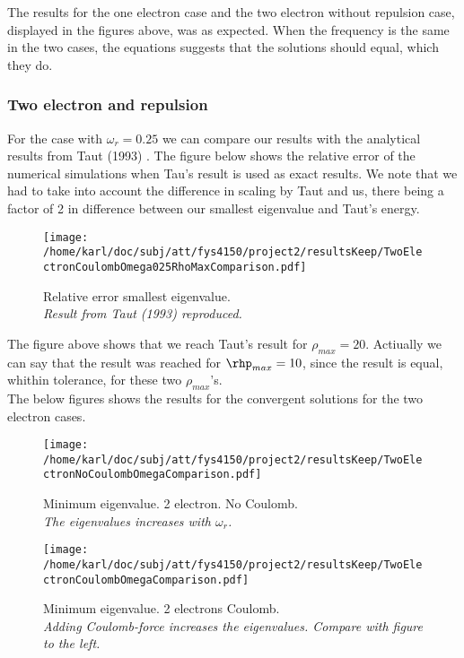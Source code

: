 \documentclass{article}
\begin{document}
The results for the one electron case and the two electron without repulsion case, displayed in the figures above, was as expected. When the frequency is the same in the two cases, the equations suggests that the solutions should equal, which they do.

\subsubsection{Two electron and repulsion}
For the case with $\omega_r = 0.25$ we can compare our results with the analytical results from Taut (1993) \cite{taut}. The figure below shows the relative error of the numerical simulations when Tau's result is used as exact results. We note that we had to take into account the difference in scaling by Taut and us, there being a factor of 2 in difference between our smallest eigenvalue and Taut's energy.

\begin{figure}[H]
	\centering
	\texttt{[image: /home/karl/doc/subj/att/fys4150/project2/resultsKeep/TwoElectronCoulombOmega025RhoMaxComparison.pdf]}
	\caption{Relative error smallest eigenvalue. \\
		\textit{Result from Taut (1993) \cite{taut} reproduced.}}
	\label{1}
\end{figure}

The figure above shows that we reach Taut's result for $\rho_{max} = 20$. Actiually we can say that the result was reached for $\rhp_{max} = 10$, since the result is equal, whithin tolerance, for these two $\rho_{max}$'s. \\

The below figures shows the results for the convergent solutions for the two electron cases.

\begin{minipage}{.49\textwidth} %
	\begin{figure}[H]
		\centering
		\texttt{[image: /home/karl/doc/subj/att/fys4150/project2/resultsKeep/TwoElectronNoCoulombOmegaComparison.pdf]}
		\caption{Minimum eigenvalue. 2 electron. No Coulomb. \\
			\textit{The eigenvalues increases with $\omega_r$.}}
		\label{1}
	\end{figure}
\end{minipage}\hfill
\vspace{2ex}
\begin{minipage}{.49\textwidth}
	\begin{figure}[H]
		\centering
		\texttt{[image: /home/karl/doc/subj/att/fys4150/project2/resultsKeep/TwoElectronCoulombOmegaComparison.pdf]}
		\caption{Minimum eigenvalue. 2 electrons  Coulomb.\\
			\textit{Adding Coulomb-force increases the eigenvalues. Compare with figure to the left.}}
		\label{1}
	\end{figure}
\end{minipage}\hfill
\vspace{2ex}
\end{document}
